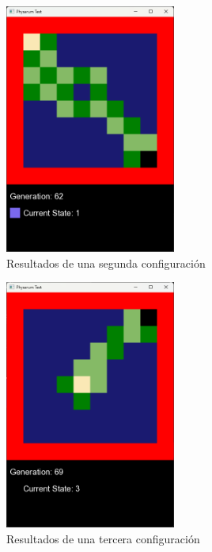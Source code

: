     \vskip 0.5cm
    \begin{figure}[htbp]
        \centering
        \includegraphics[width=0.5\textwidth]{./images/Pruebas/simulador/image004.png}
        \caption{Resultados de una segunda configuraci\'on}
        \label{fig:conf2}
    \end{figure}
    \vskip 0.5cm
    \begin{figure}[htbp]
        \centering
        \includegraphics[width=0.5\textwidth]{./images/Pruebas/simulador/image005.png}
        \caption{Resultados de una tercera configuraci\'on}
        \label{fig:conf3}
    \end{figure}
    \vskip 0.5cm
